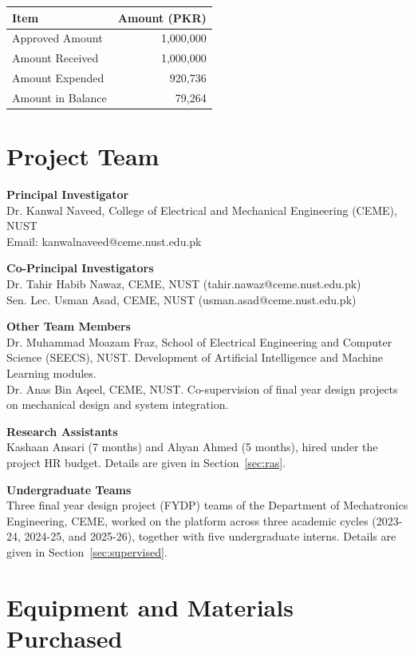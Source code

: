 \documentclass[11pt,a4paper]{article}
\begin{document}
\begin{table}[H]
\centering
\begin{tabular}{@{}lr@{}}
\toprule
\textbf{Item} & \textbf{Amount (PKR)} \\
\midrule
Approved Amount & 1,000,000 \\
Amount Received & 1,000,000 \\
Amount Expended & 920,736 \\
Amount in Balance & 79,264 \\
\bottomrule
\end{tabular}
\end{table}

\section{Project Team}

\textbf{Principal Investigator}\\
Dr. Kanwal Naveed, College of Electrical and Mechanical Engineering (CEME), NUST\\
Email: kanwalnaveed@ceme.nust.edu.pk

\textbf{Co-Principal Investigators}\\
Dr. Tahir Habib Nawaz, CEME, NUST (tahir.nawaz@ceme.nust.edu.pk)\\
Sen. Lec. Usman Asad, CEME, NUST (usman.asad@ceme.nust.edu.pk)

\textbf{Other Team Members}\\
Dr. Muhammad Moazam Fraz, School of Electrical Engineering and Computer Science (SEECS), NUST. Development of Artificial Intelligence and Machine Learning modules.\\
Dr. Anas Bin Aqeel, CEME, NUST. Co-supervision of final year design projects on mechanical design and system integration.

\textbf{Research Assistants}\\
Kashaan Ansari (7 months) and Ahyan Ahmed (5 months), hired under the project HR budget. Details are given in Section~\ref{sec:ras}.

\textbf{Undergraduate Teams}\\
Three final year design project (FYDP) teams of the Department of Mechatronics Engineering, CEME, worked on the platform across three academic cycles (2023-24, 2024-25, and 2025-26), together with five undergraduate interns. Details are given in Section~\ref{sec:supervised}.

\section{Equipment and Materials Purchased}
\end{document}
